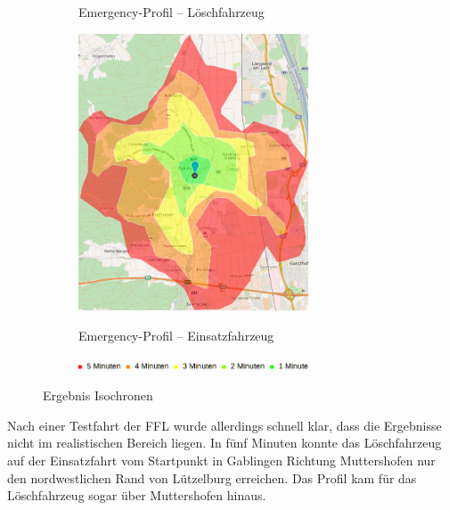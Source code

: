 \begin{figure}[h]
\begin{subfigure}{0.49\textwidth}
\caption{Emergency-Profil -- Löschfahrzeug}
\label{fig:isofire}
\end{subfigure}
\begin{subfigure}{0.49\textwidth}
\centering
\includegraphics[width = 0.75\textwidth]{../media/isoeme.png} \\
\caption{Emergency-Profil -- Einsatzfahrzeug}
\label{fig:isoeme}
\end{subfigure}
\begin{subfigure}{0.90\textwidth}
\centering
\includegraphics[width = 0.75\textwidth]{../media/legendiso.png} \\
\end{subfigure}
\caption{Ergebnis Isochronen}
\label{fig:isochrones}
\end{figure}


Nach einer Testfahrt der FFL wurde allerdings schnell klar, dass die Ergebnisse nicht im realistischen Bereich liegen.
In fünf Minuten konnte das Löschfahrzeug auf der Einsatzfahrt vom Startpunkt in Gablingen Richtung Muttershofen nur den nordwestlichen Rand von Lützelburg erreichen.
Das Profil kam für das Löschfahrzeug sogar über Muttershofen hinaus.



